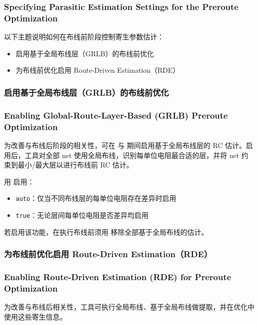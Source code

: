 \subsubsection*{Specifying Parasitic Estimation Settings for the Preroute Optimization}

以下主题说明如何在布线前阶段控制寄生参数估计：
\begin{itemize}
  \item 启用基于全局布线层（GRLB）的布线前优化
  \item 为布线前优化启用 Route-Driven Estimation（RDE）
\end{itemize}

\subsubsection{启用基于全局布线层（GRLB）的布线前优化}
\subsubsection*{Enabling Global-Route-Layer-Based (GRLB) Preroute Optimization}

为改善与布线后阶段的相关性，可在  与  期间启用基于全局布线层的 RC 估计。启用后，工具对全部 net 使用全局布线，识别每单位电阻最合适的层，并将 net 约束到最小/最大层以进行布线前 RC 估计。

用  启用：
\begin{itemize}
  \item \texttt{auto}：仅当不同布线层的每单位电阻存在差异时启用
  \item \texttt{true}：无论层间每单位电阻是否差异均启用
\end{itemize}

若启用该功能，在执行布线前须用  移除全部基于全局布线的估计。

\subsubsection{为布线前优化启用 Route-Driven Estimation（RDE）}
\subsubsection*{Enabling Route-Driven Estimation (RDE) for Preroute Optimization}

为改善与布线后相关性，工具可执行全局布线、基于全局布线做提取，并在优化中使用这些寄生信息。

